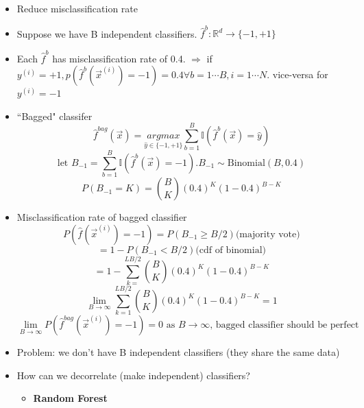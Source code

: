 \documentclass[10pt, oneside]{article}
\newcommand{\R}{\mathbb{R}}
\begin{document}
\begin{itemize}
    \item Reduce misclassification rate
    \item Suppose we have B independent classifiers. $\hat f^b :\R^d \rightarrow \{-1, +1\}$
    \item Each $\hat f^b$ has misclassification rate of 0.4. $\Rightarrow$ if $y^{(i)} = + 1, p(\hat f^{b} (\vec x^{(i)} ) = -1 ) = 0.4 \forall b=1\cdots B, i=1\cdots N$. vice-versa for $y^{(i)} = -1$
    \item ``Bagged" classifer\[\hat f^{bag}(\vec x) = \underset{\hat y\in \{-1,+1\}}{argmax}\sum_{b=1}^B \mathbb{I} (\hat f^b (\vec x) = \hat y)\]
    \[\text{let }B_{-1} = \sum_{b=1} ^B \mathbb{I}(\hat f^b(\vec x) = -1). B_{-1} \sim \text{Binomial}(B,0.4)\]
    \[P(B_{-1} = K) = \binom{B}{K} (0.4)^K(1-0.4)^{B-K}\]
    \item Misclassification rate of bagged classifier\[P(\hat f(\vec x^{(i)} ) = -1) = P(B_{-1} \geq B/2) \text{(majority vote)}\]
    \[=1-P(B_{-1} < B/2) \text{(cdf of binomial)}\]
    \[=1-\sum_{k=}^{LB/2} \binom{B}{K}(0.4)^K(1-0.4)^{B-K}\]
    \[\underset{B\rightarrow \infty}{\lim}\sum_{k=1} ^{LB/2} \binom{B}{K}(0.4)^K(1-0.4)^{B-K} = 1\]
    \[\underset{B\rightarrow \infty }{\lim} P(\hat f^{bag} (\vec x ^{(i)}) = -1) = 0 \text{ as $B\rightarrow \infty$, bagged classifier should be perfect}\]
    \item Problem: we don't have B independent classifiers (they share the same data)
    \item How can we decorrelate (make independent) classifiers?
    \begin{itemize}
        \item \textbf{Random Forest}
    \end{itemize}
\end{itemize}
\end{document}
